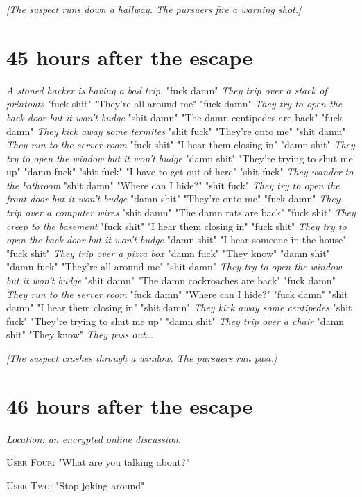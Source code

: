 \documentclass{report}
\begin{document}
\textit{[The suspect runs down a hallway. The pursuers fire a warning shot.]}


\section*{45 \small{hours after the escape}}

\textit{A stoned hacker is having a bad trip.} "fuck damn" \textit{They trip over a stack of printouts} "fuck shit" "They're all around me" "fuck damn" \textit{They try to open the back door but it won't budge} "shit damn" "The damn centipedes are back" "fuck damn" \textit{They kick away some termites} "shit fuck" "They're onto me" "shit damn" \textit{They run to the server room} "fuck shit" "I hear them closing in" "damn shit" \textit{They try to open the window but it won't budge} "damn shit" "They're trying to shut me up" "damn fuck" \textit{} "shit fuck" "I have to get out of here" "shit fuck" \textit{They wander to the bathroom} "shit damn" "Where can I hide?" "shit fuck" \textit{They try to open the front door but it won't budge} "damn shit" "They're onto me" "fuck damn" \textit{They trip over a computer wires} "shit damn" "The damn rats are back" "fuck shit" \textit{They creep to the basement} "fuck shit" "I hear them closing in" "fuck shit" \textit{They try to open the back door but it won't budge} "damn shit" "I hear someone in the house" "fuck shit" \textit{They trip over a pizza box} "damn fuck" "They know" "damn shit" \textit{} "damn fuck" "They're all around me" "shit damn" \textit{They try to open the window but it won't budge} "shit damn" "The damn cockroaches are back" "fuck damn" \textit{They run to the server room} "fuck damn" "Where can I hide?" "fuck damn" \textit{} "shit damn" "I hear them closing in" "shit damn" \textit{They kick away some centipedes} "shit fuck" "They're trying to shut me up" "damn shit" \textit{They trip over a chair} "damn shit" "They know" \textit{They pass out}...

\textit{[The suspect crashes through a window. The pursuers run past.]}


\section*{46 \small{hours after the escape}}

\textit{Location: an encrypted online discussion}. 

\textsc{User Four}: "What are you talking about?" 

\textsc{User Two}: "Stop joking around" 
\end{document}
